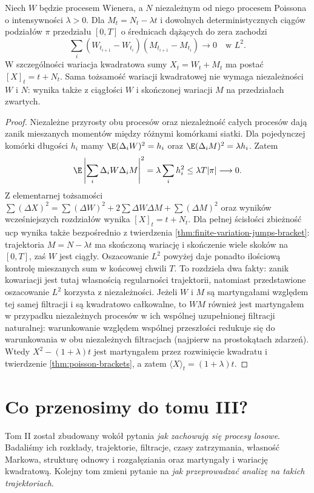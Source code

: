 \begin{stwierdzenie}
Niech $W$ będzie procesem Wienera, a $N$ niezależnym
od niego procesem Poissona o intensywności $\lambda>0$.
Dla $M_t=N_t-\lambda t$ i dowolnych deterministycznych
ciągów podziałów $\pi$ przedziału $[0,T]$
o średnicach dążących do zera zachodzi
\[
\sum_i(W_{t_{i+1}}-W_{t_i})
(M_{t_{i+1}}-M_{t_i})\longrightarrow0
\quad\text{w }L^2.
\]
W szczególności wariacja kwadratowa sumy
$X_t=W_t+M_t$ ma postać $[X]_t=t+N_t$.
Sama tożsamość wariacji kwadratowej nie wymaga
niezależności $W$ i $N$: wynika także z ciągłości $W$
i skończonej wariacji $M$ na przedziałach zwartych.
\end{stwierdzenie}
\begin{proof}
Niezależne przyrosty obu procesów oraz niezależność
całych procesów dają zanik mieszanych momentów
między różnymi komórkami siatki. Dla pojedynczej komórki
długości $h_i$ mamy
$\E(\Delta_iW)^2=h_i$ oraz
$\E(\Delta_iM)^2=\lambda h_i$.
Zatem
\[
\E\left|\sum_i\Delta_iW\Delta_iM\right|^2
=\lambda\sum_i h_i^2\le\lambda T|\pi|\longrightarrow0.
\]
Z elementarnej tożsamości
$\sum(\Delta X)^2=\sum(\Delta W)^2+
2\sum\Delta W\Delta M+\sum(\Delta M)^2$
oraz wyników wcześniejszych rozdziałów wynika
$[X]_t=t+N_t$. Dla pełnej ścisłości zbieżność ucp
wynika także bezpośrednio z twierdzenia
\ref{thm:finite-variation-jumps-bracket}: trajektoria
$M=N-\lambda t$ ma skończoną wariację i skończenie
wiele skoków na $[0,T]$, zaś $W$ jest ciągły.
Oszacowanie $L^2$ powyżej daje ponadto ilościową kontrolę
mieszanych sum w końcowej chwili $T$.
To rozdziela dwa fakty: zanik kowariacji jest tutaj
własnością regularności trajektorii, natomiast przedstawione oszacowanie $L^2$
korzysta z niezależności.
Jeżeli $W$ i $M$ są martyngałami względem tej samej
filtracji i są kwadratowo całkowalne, to
$WM$ również jest martyngałem w przypadku niezależnych
procesów w ich wspólnej uzupełnionej filtracji
naturalnej: warunkowanie względem wspólnej przeszłości
redukuje się do warunkowania w obu niezależnych
filtracjach (najpierw na prostokątach zdarzeń).
Wtedy $X^2-(1+\lambda)t$ jest martyngałem przez
rozwinięcie kwadratu i twierdzenie
\ref{thm:poisson-brackets}, a zatem
$\langle X\rangle_t=(1+\lambda)t$.
\end{proof}

\section{Co przenosimy do tomu III?}
Tom II został zbudowany wokół pytania \emph{jak zachowują
się procesy losowe}. Badaliśmy ich rozkłady, trajektorie,
filtracje, czasy zatrzymania, własność Markowa, strukturę
odnowy i rozgałęziania oraz martyngały i wariację
kwadratową. Kolejny tom zmieni pytanie na
\emph{jak przeprowadzać analizę na takich trajektoriach}.

